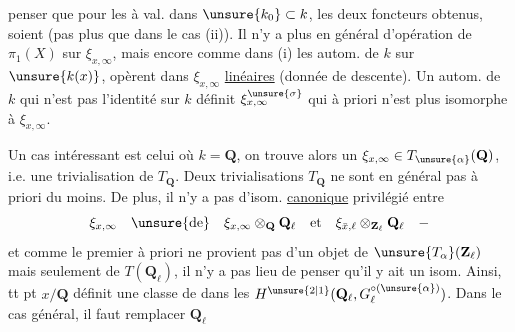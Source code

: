 penser que pour les  à val. dans $\unsure{k_0}\subset k$, les deux foncteurs obtenus, soient  (pas plus que dans le cas (ii)). Il n'y a plus en général d'opération de $\pi_1(X)$ sur $\xi_{x,\infty}$, mais encore comme dans (i) les autom. de $k$ sur $\unsure{k(x)}$, opèrent dans $\xi_{x,\infty}$  \uline{linéaires} (donnée de descente). Un autom. de $k$ qui n'est pas l'identité sur $k$ définit $\xi_{x,\infty}^{\unsure{\sigma}}$ qui à priori n'est plus isomorphe à $\xi_{x,\infty}$.

Un cas intéressant est celui où $k=\mathbf Q$, on trouve alors un  $\xi_{x,\infty}\in T_{\unsure{\alpha}}(\mathbf Q)$, i.e. une trivialisation de $T_{\mathbf Q}$. Deux trivialisations  $T_{\mathbf Q}$ ne sont en général pas  à priori du moins. De plus, il n'y a pas d'isom. \uline{canonique} privilégié entre
\[
\xi_{x,\infty}\quad\unsure{\text{de}}\quad\xi_{x,\infty}\otimes_{\mathbf Q}\mathbf Q_\ell
\quad\text{et}\quad\xi_{\bar x,\ell}\otimes_{\mathbf Z_\ell}\mathbf Q_\ell\quad-
\]
 et comme le premier à priori ne provient pas d'un objet de $\unsure{T_{\alpha}}(\mathbf Z_\ell)$ mais seulement de $T(\mathbf Q_\ell)$, il n'y a pas lieu de penser qu'il y ait  un isom. Ainsi, tt pt $x/\mathbf Q$ définit une classe de  dans les $H^{\unsure{2|1}}(\mathbf Q_\ell,G_\ell^{\circ(\unsure{\alpha})})$. Dans le cas général, il faut remplacer $\mathbf Q_\ell$

